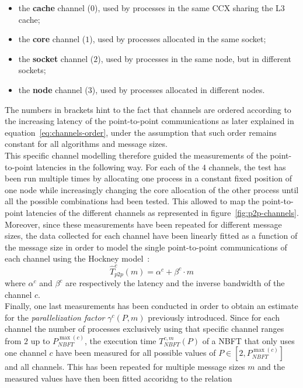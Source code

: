\documentclass[../main.tex]{subfiles}
\begin{document}
\begin{itemize}[itemsep=0pt]
    \item the \textbf{cache} channel ($0$), used by processes in the same CCX sharing the L3 cache;
    \item the \textbf{core} channel ($1$), used by processes allocated in the same socket;
    \item the \textbf{socket} channel ($2$), used by processes in the same node, but in different sockets;
    \item the \textbf{node} channel ($3$), used by processes allocated in different nodes.
\end{itemize}
The numbers in brackets hint to the fact that channels are ordered according to the increasing latency of the point-to-point communications as later explained in equation~\ref{eq:channels-order}, under the assumption that such order remains constant for all algorithms and message sizes.\\
This specific channel modelling therefore guided the measurements of the point-to-point latencies in the following way. For each of the $4$ channels, the  test has been run multiple times by allocating one process in a constant fixed position of one node while increasingly changing the core allocation of the other process until all the possible combinations had been tested. This allowed to map the point-to-point latencies of the different channels as represented in figure~\ref{fig:p2p-channels}.
Moreover, since these measurements have been repeated for different message sizes, the data collected for each channel have been linearly fitted as a function of the message size in order to model the single point-to-point communications of each channel using the Hockney model~\cite{Hockney}:
\begin{equation}\label{eq:hockney}
    \widehat{T}^{c}_{p2p}(m) = \alpha^{c} + \beta^{c} \cdot m
\end{equation}
where $\alpha^{c}$ and $\beta^{c}$ are respectively the latency and the inverse bandwidth of the channel $c$.\\
Finally, one last measurements has been conducted in order to obtain an estimate for the \textit{parallelization factor} $\gamma^{c}(P,m)$ previously introduced. Since for each channel the number of processes exclusively using that specific channel ranges from $2$ up to $P^{\max(c)}_{NBFT}$, the execution time $T^{c,m}_{NBFT}(P)$ of a NBFT that only uses one channel $c$ have been measured for all possible values of $P \in [2,P^{\max(c)}_{NBFT}]$ and all channels. This has been repeated for multiple message sizes $m$ and the measured values have then been fitted accoridng to the relation  
\end{document}
